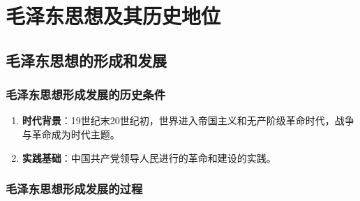 \noparindent
\section{毛泽东思想及其历史地位}

\subsection{毛泽东思想的形成和发展}
\subsubsection{毛泽东思想形成发展的历史条件}
\begin{enumerate}
    \item \textbf{时代背景}：19世纪末20世纪初，世界进入帝国主义和无产阶级革命时代，战争与革命成为时代主题。
    \item \textbf{实践基础}：中国共产党领导人民进行的革命和建设的实践。
\end{enumerate}

\subsubsection{毛泽东思想形成发展的过程}
